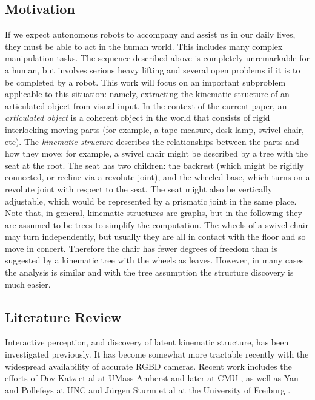 \documentclass[a4paper,orivec]{llncs}
\begin{document}
\subsection{Motivation}
If we expect autonomous robots to accompany and assist us in our daily lives, they must be able to act in the human world. This includes many complex manipulation tasks. The sequence described above is completely unremarkable for a human, but involves serious heavy lifting and several open problems if it is to be completed by a robot. This work will focus on an important subproblem applicable to this situation: namely, extracting the kinematic structure of an articulated object from visual input. In the context of the current paper, an \emph{articulated object} is a coherent object in the world that consists of rigid interlocking moving parts (for example, a tape measure, desk lamp, swivel chair, etc). The \emph{kinematic structure} describes the relationships between the parts and how they move; for example, a swivel chair might be described by a tree with the seat at the root. The seat has two children: the backrest (which might be rigidly connected, or recline via a revolute joint), and the wheeled base, which turns on a revolute joint with respect to the seat. The seat might also be vertically adjustable, which would be represented by a prismatic joint in the same place. Note that, in general, kinematic structures are graphs, but in the following they are assumed to be trees to simplify the computation. The wheels of a swivel chair may turn independently, but usually they are all in contact with the floor and so move in concert. Therefore the chair has fewer degrees of freedom than is suggested by a kinematic tree with the wheels as leaves. However, in many cases the analysis is similar and with the tree assumption the structure discovery is much easier.

\subsection{Literature Review}
Interactive perception, and discovery of latent kinematic structure, has been investigated previously. It has become somewhat more tractable recently with the widespread availability of accurate RGBD cameras. Recent work includes the efforts of Dov Katz et al at UMass-Amherst \cite{Katz2008,Katz2008a} and later at CMU \cite{Katz2012}, as well as Yan and Pollefeys at UNC \cite{Yan2006} and J\"{u}rgen Sturm et al at the University of Freiburg \cite{Sturm2011}.
\end{document}
